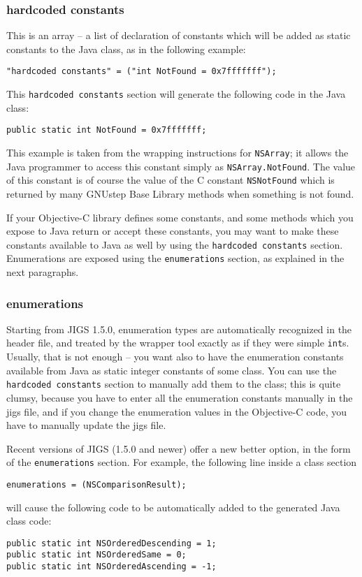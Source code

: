 \subsubsection{hardcoded constants}
This is an array -- a list of declaration of constants which will be
added as static constants to the Java class, as in the following
example:
\begin{verbatim}
"hardcoded constants" = ("int NotFound = 0x7fffffff");
\end{verbatim}
This \texttt{hardcoded constants} section will generate the following
code in the Java class:
\begin{verbatim}
public static int NotFound = 0x7fffffff;
\end{verbatim}
This example is taken from the wrapping instructions for
\texttt{NSArray}; it allows the Java programmer to access this
constant simply as \texttt{NSArray.NotFound}.  The value of this
constant is of course the value of the C constant \texttt{NSNotFound}
which is returned by many GNUstep Base Library methods when something
is not found.

If your Objective-C library defines some constants, and some methods
which you expose to Java return or accept these constants, you may
want to make these constants available to Java as well by using the
\texttt{hardcoded constants} section.  Enumerations are exposed using 
the \texttt{enumerations} section, as explained in the next
paragraphs.

\subsubsection{enumerations}

Starting from JIGS 1.5.0, enumeration types are automatically
recognized in the header file, and treated by the wrapper tool exactly
as if they were simple \texttt{int}s.  Usually, that is not enough --
you want also to have the enumeration constants available from Java as
static integer constants of some class.  You can use the
\texttt{hardcoded constants} section to manually add them to the
class; this is quite clumsy, because you have to enter all the
enumeration constants manually in the jigs file, and if you change the
enumeration values in the Objective-C code, you have to manually
update the jigs file.

Recent versions of JIGS (1.5.0 and newer) offer a new better option,
in the form of the \texttt{enumerations} section.  For example, the
following line inside a class section
\begin{verbatim}
enumerations = (NSComparisonResult);
\end{verbatim}
will cause the following code to be automatically added to the
generated Java class code:
\begin{verbatim} 
public static int NSOrderedDescending = 1;
public static int NSOrderedSame = 0;
public static int NSOrderedAscending = -1;
\end{verbatim}

